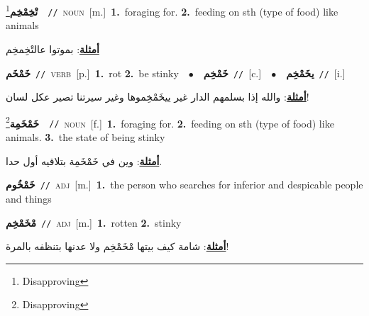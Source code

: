 \documentclass[10pt,a4paper,twoside]{article} %
\begin{document}
\begin{multicols}{2}
{\setlength\topsep{0pt}\textbf{\foreignlanguage{arabic}{تْخِمْخِم}}\footnote{Disapproving}\ \ {\color{gray}\texttt{//}\color{black}}\ \textsc{noun}\ [m.]\ \textbf{1.}~foraging for.  \textbf{2.}~feeding on sth (type of food) like animals\  \begin{flushright}\color{gray}\foreignlanguage{arabic}{\textbf{\underline{\foreignlanguage{arabic}{أمثلة}}}: بموتوا عالتْخِمخِم}\end{flushright}\color{black}} \vspace{2mm}

{\setlength\topsep{0pt}\textbf{\foreignlanguage{arabic}{خَمْخَم}}\ {\color{gray}\texttt{//}\color{black}}\ \textsc{verb}\ [p.]\ \textbf{1.}~rot  \textbf{2.}~be stinky\ \ $\bullet$\ \ \setlength\topsep{0pt}\textbf{\foreignlanguage{arabic}{خَمْخِم}}\ {\color{gray}\texttt{//}\color{black}}\ [c.]\ \ $\bullet$\ \ \setlength\topsep{0pt}\textbf{\foreignlanguage{arabic}{يخَمْخِم}}\ {\color{gray}\texttt{//}\color{black}}\ [i.]\  \begin{flushright}\color{gray}\foreignlanguage{arabic}{\textbf{\underline{\foreignlanguage{arabic}{أمثلة}}}: والله إذا بسلمهم الدار غير ييخَمْخِموها وغير سيرتنا تصير عكل لسان!}\end{flushright}\color{black}} \vspace{2mm}

{\setlength\topsep{0pt}\textbf{\foreignlanguage{arabic}{خَمْخَمِة}}\footnote{Disapproving}\ \ {\color{gray}\texttt{//}\color{black}}\ \textsc{noun}\ [f.]\ \textbf{1.}~foraging for.  \textbf{2.}~feeding on sth (type of food) like animals.  \textbf{3.}~the state of being stinky\  \begin{flushright}\color{gray}\foreignlanguage{arabic}{\textbf{\underline{\foreignlanguage{arabic}{أمثلة}}}: وين في خَمْخَمِة بتلاقيه أول حدا.}\end{flushright}\color{black}} \vspace{2mm}

{\setlength\topsep{0pt}\textbf{\foreignlanguage{arabic}{خَمْخُوم}}\ {\color{gray}\texttt{//}\color{black}}\ \textsc{adj}\ [m.]\ \textbf{1.}~the person who searches for inferior and despicable people and things\ } \vspace{2mm}

{\setlength\topsep{0pt}\textbf{\foreignlanguage{arabic}{مْخَمْخِم}}\ {\color{gray}\texttt{//}\color{black}}\ \textsc{adj}\ [m.]\ \textbf{1.}~rotten  \textbf{2.}~stinky\  \begin{flushright}\color{gray}\foreignlanguage{arabic}{\textbf{\underline{\foreignlanguage{arabic}{أمثلة}}}: شامة كيف بيتها مْخَمْخِم ولا عدنها بتنظفه بالمرة!}\end{flushright}\color{black}} \vspace{2mm}


\end{multicols}
\end{document}
